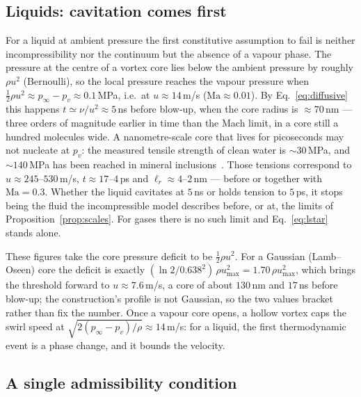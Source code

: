 \documentclass[11pt,a4paper]{article}
\begin{document}
\subsection{Liquids: cavitation comes first}

For a liquid at ambient pressure the first constitutive assumption to fail is neither
incompressibility nor the continuum but the absence of a vapour phase. The pressure at the centre
of a vortex core lies below the ambient pressure by roughly $\rho u^2$ (Bernoulli), so the local
pressure reaches the vapour pressure when $\tfrac12\rho u^2\approx p_\infty-p_v\approx0.1$\,MPa,
i.e.\ at $u\approx14$\,m/s ($\mathrm{Ma}\approx0.01$). By Eq.~\eqref{eq:diffusive} this happens
$t\simeq\nu/u^2\approx5$\,ns before blow-up, when the core radius is $\approx70$\,nm --- three
orders of magnitude earlier in time than the Mach limit, in a core still a hundred molecules wide.
A nanometre-scale core that lives for picoseconds may not nucleate at $p_v$: the measured tensile
strength of clean water is $\sim30$\,MPa, and $\sim140$\,MPa has been reached in mineral
inclusions~\cite{ZhengAngell1991,CaupinHerbert2006}. Those tensions correspond to
$u\approx245$--$530$\,m/s, $t\approx17$--$4$\,ps and $\ell_r\approx4$--$2$\,nm --- before or
together with $\mathrm{Ma}=0.3$. Whether the liquid cavitates at $5$\,ns or holds tension to
$5$\,ps, it stops being the fluid the incompressible model describes before, or at, the limits of
Proposition~\ref{prop:scales}. For gases there is no such limit and Eq.~\eqref{eq:lstar} stands
alone.

These figures take the core pressure deficit to be $\tfrac12\rho u^2$. For a Gaussian (Lamb--Oseen)
core the deficit is exactly $(\ln2/0.638^2)\,\rho u_{\max}^2=1.70\,\rho u_{\max}^2$, which brings the
threshold forward to $u\approx7.6$\,m/s, a core of about $130$\,nm and $17$\,ns before blow-up; the
construction's profile is not Gaussian, so the two values bracket rather than fix the number. Once a
vapour core opens, a hollow vortex caps the swirl speed at $\sqrt{2(p_\infty-p_v)/\rho}\approx14$\,m/s:
for a liquid, the first thermodynamic event is a phase change, and it bounds the velocity.

\subsection{A single admissibility condition}
\label{sec:admissibility}
\end{document}
